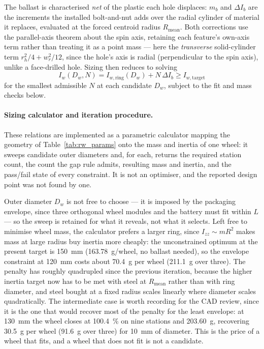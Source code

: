 The ballast is characterised \emph{net} of the plastic each hole displaces:
$m_b$ and $\Delta I_b$ are the increments the installed bolt-and-nut adds over
the radial cylinder of material it replaces, evaluated at the forced centroid
radius $R_{\text{mean}}$. Both corrections use the parallel-axis theorem about
the spin axis, retaining each feature's own-axis term rather than treating it
as a point mass --- here the \emph{transverse} solid-cylinder term
$r_h^2/4+w_r^2/12$, since the hole's axis is radial (perpendicular to the spin
axis), unlike a face-drilled hole. Sizing then reduces to solving
\[
I_w(D_w,N) = I_{w,\text{ring}}(D_w) + N\,\Delta I_b \geq I_{w,\text{target}}
\]
for the smallest admissible $N$ at each candidate $D_w$, subject to the fit
and mass checks below.

\paragraph{Sizing calculator and iteration procedure.} These relations are
implemented as a parametric calculator mapping the geometry of
Table~\ref{tab:rw_params} onto the mass and inertia of one wheel: it sweeps
candidate outer diameters and, for each, returns the required station count,
the count the gap rule admits, resulting mass and inertia, and the pass/fail
state of every constraint. It is not an optimiser, and the reported design
point was not found by one.

Outer diameter $D_w$ is not free to choose --- it is imposed by the packaging
envelope, since three orthogonal wheel modules and the battery must fit within
$L$ --- so the sweep is retained for what it reveals, not what it selects.
Left free to minimise wheel mass, the calculator prefers a larger ring, since
$I_{zz}\sim mR^2$ makes mass at large radius buy inertia more cheaply: the
unconstrained optimum at the present target is \qty{150}{\milli\metre}
(\qty{163.78}{\gram}/wheel, no ballast needed), so the envelope constraint at
\qty{120}{\milli\metre} costs about \qty{70.4}{\gram} per wheel
(\qty{211.1}{\gram} over three). The penalty has roughly quadrupled since the
previous iteration, because the higher inertia target now has to be met with
steel at $R_{\text{mean}}$ rather than with ring diameter, and steel bought at
a fixed radius scales linearly where diameter scales quadratically. The
intermediate case is worth recording for the CAD review, since it is the one
that would recover most of the penalty for the least envelope: at
\qty{130}{\milli\metre} the wheel closes at \qty{100.4}{\percent} on nine
stations and \qty{203.60}{\gram}, recovering \qty{30.5}{\gram} per wheel
(\qty{91.6}{\gram} over three) for \qty{10}{\milli\metre} of diameter. This is
the price of a wheel that fits, and a wheel that does not fit is not a
candidate.

